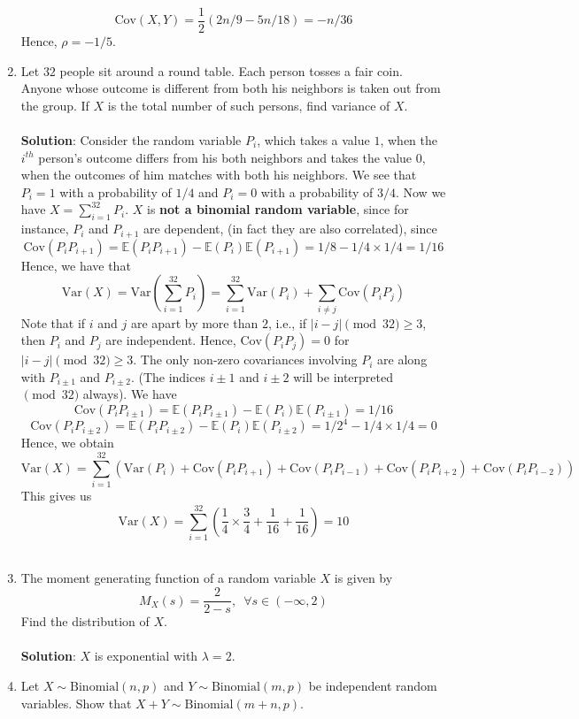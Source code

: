 \documentclass{article}
\newcommand{\dsum}{\displaystyle\sum}
\newcommand{\abs}[1]{\displaystyle\left\lvert#1\right\rvert}
\newcommand{\Eb}{\mathbb{E}}
\newcommand{\bkt}[1]{\left(#1\right)}
\newcommand{\soln}[1]{\\ \textbf{Solution}:#1\\}
\begin{document}
\begin{enumerate}
{	$$\text{Cov}\bkt{X,Y} = \dfrac12\bkt{2n/9-5n/18} = -n/36$$
	Hence, $\rho = -1/5$.
	}
	\item
	Let $32$ people sit around a round table. Each person tosses a fair coin. Anyone whose outcome is different from both his neighbors is taken out from the group. If $X$ is the total number of such persons, find variance of $X$.\\
	\soln{
	Consider the random variable $P_i$, which takes a value $1$, when the $i^{th}$ person's outcome differs from his both neighbors and takes the value $0$, when the outcomes of him matches with both his neighbors. We see that $P_i = 1$ with a probability of $1/4$ and $P_i=0$ with a probability of $3/4$. Now we have $X = \dsum_{i=1}^{32} P_i$. $X$ is \textbf{not a binomial random variable}, since for instance, $P_i$ and $P_{i+1}$ are dependent, (in fact they are also correlated), since
	$$\text{Cov}\bkt{P_i P_{i+1}} = \Eb\bkt{P_i P_{i+1}} - \Eb\bkt{P_i} \Eb\bkt{P_{i+1}} = 1/8-1/4 \times 1/4 = 1/16$$
	Hence, we have that
	$$\text{Var}\bkt{X} = \text{Var}\bkt{\dsum_{i=1}^{32} P_i} = \dsum_{i=1}^{32}\text{Var}\bkt{P_i} + \dsum_{i \neq j} \text{Cov}\bkt{P_iP_j}$$
	Note that if $i$ and $j$ are apart by more than $2$, i.e., if $\abs{i-j}\pmod{32} \geq 3$, then $P_i$ and $P_j$ are independent. Hence, $\text{Cov}\bkt{P_iP_j} = 0$ for $\abs{i-j}\pmod{32} \geq 3$. The only non-zero covariances involving $P_i$ are along with $P_{i\pm1}$ and $P_{i \pm 2}$. (The indices $i\pm1$ and $i\pm2$ will be interpreted $\pmod{32}$ always). We have
	$$\text{Cov}\bkt{P_i P_{i \pm 1}} = \Eb\bkt{P_i P_{i \pm 1}} - \Eb\bkt{P_i}\Eb\bkt{P_{i \pm 1}} = 1/16$$
	$$\text{Cov}\bkt{P_i P_{i \pm 2}} = \Eb\bkt{P_i P_{i \pm 2}} - \Eb\bkt{P_i}\Eb\bkt{P_{i \pm 2}} = 1/2^4 - 1/4 \times 1/4 = 0$$
	Hence, we obtain
	$$\text{Var}\bkt{X} = \dsum_{i=1}^{32} \bkt{\text{Var}\bkt{P_i} + \text{Cov}\bkt{P_i P_{i+1}} + \text{Cov}\bkt{P_i P_{i-1}} + \text{Cov}\bkt{P_i P_{i+2}} + \text{Cov}\bkt{P_i P_{i-2}}}$$
	This gives us
	$$\text{Var}\bkt{X} = \dsum_{i=1}^{32} \bkt{\dfrac14 \times \dfrac34 + \dfrac1{16} + \dfrac1{16}} = 10$$
	}
	\item
	The moment generating function of a random variable $X$ is given by
	$$M_X(s) = \dfrac2{2-s}, \,\,\, \forall s \in (-\infty,2)$$
	Find the distribution of $X$.\\
	\soln{
	$X$ is exponential with $\lambda=2$.}
	\item
	Let $X \sim \text{Binomial}(n,p)$ and $Y \sim \text{Binomial}(m,p)$ be independent random variables. Show that $X+Y \sim \text{Binomial}(m+n,p)$.\\

\end{enumerate}
\end{document}
